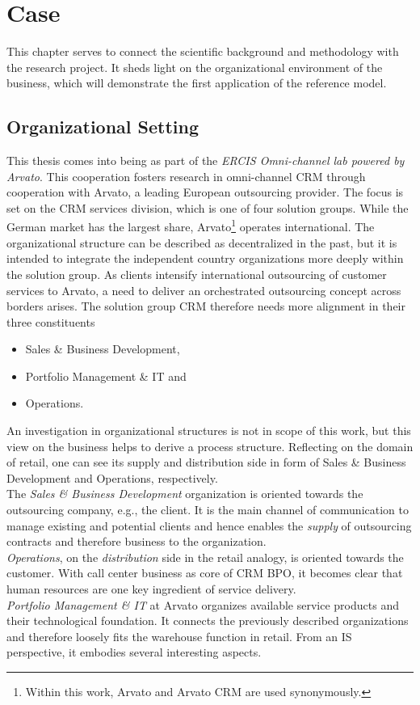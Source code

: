 \chapter{Case}
\label{chap:case}
This chapter serves to connect the scientific background and methodology with the research project. 
It sheds light on the organizational environment of the business, which will demonstrate the first application of the reference model. 

\section{Organizational Setting}
\label{chap:case:org}
This thesis comes into being as part of the \textit{ERCIS Omni-channel lab powered by Arvato}. This cooperation fosters research in omni-channel CRM through cooperation with Arvato, a leading European outsourcing provider. The focus is set on the CRM services division, which is one of four 
solution groups. While the German market has the largest share, Arvato\footnote{Within this work, Arvato and Arvato CRM are used synonymously.} operates international. The organizational structure can be described as decentralized in the past, but it is intended to integrate the independent country organizations more deeply within the solution group. As clients intensify international outsourcing of customer services to Arvato, a need to deliver an orchestrated outsourcing concept across borders arises. The solution group CRM therefore needs more alignment in their three constituents

\begin{itemize}
	\item Sales \& Business Development,
	\item Portfolio Management \& IT and
	\item Operations.
\end{itemize}

An investigation in organizational structures is not in scope of this work, but this view on the business helps to derive a process structure. Reflecting on the domain of retail, one can see its supply and distribution side in form of Sales \& Business Development and Operations, respectively. \\
The \textit{Sales \& Business Development} organization is oriented towards the outsourcing company, e.g., the client. It is the main channel of communication to manage existing and potential clients and hence enables the \textit{supply} of outsourcing contracts and therefore business to the organization.\\
 \textit{Operations}, on the \textit{distribution} side in the retail analogy, is oriented towards the customer. With call center business as core of CRM BPO, it becomes clear that human resources are one key ingredient of service delivery.  \\
 \textit{Portfolio Management \& IT} at Arvato organizes available service products and their technological foundation. It connects the previously described organizations and therefore loosely fits the warehouse function in retail. From an \acrshort{IS} perspective, it embodies several interesting aspects.
 
